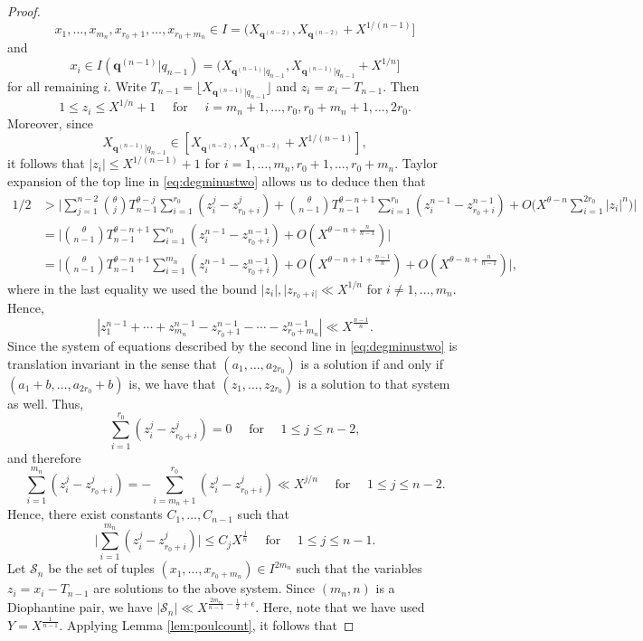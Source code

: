 \documentclass[10pt,a4paper]{amsart}
\begin{document}
\begin{proof}
\[ x_1,\ldots,x_{m_n},x_{r_0+1},\ldots,x_{r_0+m_n} \in I = (X_{\mathbf{q}^{(n-2)}}, X_{\mathbf{q}^{(n-2)}}+X^{1/(n-1)}]\] 
and 
\[x_i \in I({\mathbf{q}^{(n-1)}|q_{n-1}}) = (X_{\mathbf{q}^{(n-1)}|q_{n-1}}, X_{\mathbf{q}^{(n-1)}|q_{n-1}}+X^{1/n}] \] 
for all remaining $i$. Write $T_{n-1} = \lfloor X_{\mathbf{q}^{(n-1)}|q_{n-1}} \rfloor $ and $z_i = x_i-T_{n-1}$. Then 
\[ 1 \leq z_i \leq X^{1/n}+1 \quad \text{ for } \quad i = m_n+1,\ldots,r_0,r_0+m_n+1,\ldots,2r_0. \] Moreover, since 
\[ X_{\mathbf{q}^{(n-1)}|q_{n-1}} \in [X_{\mathbf{q}^{(n-2)}},X_{\mathbf{q}^{(n-2)}}+X^{1/(n-1)}],\] 
it follows that $|z_i| \leq X^{1/(n-1)}+1$ for $i = 1,\ldots,m_n,r_0+1,\ldots,r_0+m_n$. Taylor expansion of the top line in \eqref{eq:degminustwo} allows us to deduce then that 
\begin{align*} 
1/2 & > \Big|\sum_{j=1}^{n-2} \binom{\theta}{j} T_{n-1}^{\theta-j} \sum_{i=1}^{r_0} (z_i^j-z_{r_0+i}^j) + \binom{\theta}{n-1}T_{n-1}^{\theta-n+1} \sum_{i=1}^{r_0} (z_i^{n-1} -z_{r_0+i}^{n-1}) + O\Big(X^{\theta-n}\sum_{i=1}^{2r_0} |z_i|^n\Big) \Big| 
\\ 
& = \Big| \binom{\theta}{n-1}T_{n-1}^{\theta-n+1} \sum_{i=1}^{r_0} (z_i^{n-1} -z_{r_0+i}^{n-1}) + O(X^{\theta-n+\frac{n}{n-1}}) \Big|
\\ 
& = \Big| \binom{\theta}{n-1}T_{n-1}^{\theta-n+1} \sum_{i=1}^{m_n} (z_i^{n-1} -z_{r_0+i}^{n-1}) +O(X^{\theta-n+1+\frac{n-1}{n}}) + O(X^{\theta-n+\frac{n}{n-1}}) \Big|,
\end{align*}
where in the last equality we used the bound $|z_i|, |z_{r_0+i|} \ll X^{1/n}$ for $i \neq 1,\ldots,m_n$. Hence, 
\[ |z_1^{n-1}+\cdots+z_{m_n}^{n-1}-z_{r_0+1}^{n-1}-\cdots-z_{r_0+m_n}^{n-1}| \ll X^{\frac{n-1}{n}}. \] 
Since the system of equations described by the second line in \eqref{eq:degminustwo} is translation invariant in the sense that $(a_1,\ldots,a_{2r_0})$ is a solution if and only if $(a_1+b,\ldots, a_{2r_0}+b)$ is, we have that $(z_1,\ldots,z_{2r_0})$ is a solution to that system as well. Thus, 
\[ \sum_{i=1}^{r_0} (z_i^j-z_{r_0+i}^j) = 0 \quad \text{ for } \quad 1 \leq j \leq n-2, \]
and therefore 
\[ \sum_{i=1}^{m_n} (z_i^j-z_{r_0+i}^j) = -\sum_{i=m_n+1}^{r_0} (z_i^j-z_{r_0+i}^j) \ll X^{j/n} \quad \text{ for } \quad 1 \leq j \leq n-2. \]
Hence, there exist constants $C_1,\ldots, C_{n-1}$ such that 
\[ \Big| \sum_{i=1}^{m_n} (z_i^j - z_{r_0+i}^j ) \Big| \leq C_j X^{\frac{j}{n}} \quad \text{ for } \quad 1 \leq j \leq n-1. \]
Let $\mathcal{S}_{n}$ be the set of tuples $(x_1,\ldots,x_{r_0+m_n}) \in I^{2m_n}$ such that the variables $z_i=x_i-T_{n-1}$ are solutions to the above system. Since $(m_n,n)$ is a Diophantine pair, we have $|\mathcal{S}_{n}| \ll X^{\frac{2m_n}{n-1}-\frac{1}{2}+\epsilon}$. Here, note that we have used $Y = X^{\frac{1}{n-1}}$. Applying Lemma \ref{lem:poulcount}, it follows that 

\end{proof}
\end{document}
